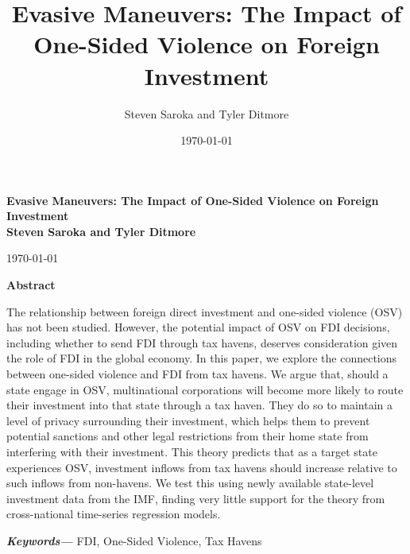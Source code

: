 \documentclass[11pt, titlepage]{article} %
\title{Evasive Maneuvers: The Impact of One-Sided Violence on Foreign Investment}
\author{Steven Saroka and Tyler Ditmore}
\date{\today}
\providecommand{\keywords}[1]
{
  \small	
  \textbf{\textit{Keywords---}} #1
}
\begin{document}
\begin{titlepage}


\thispagestyle{plain}


\singlespacing






\begin{center}
    \huge
    \textbf{Evasive Maneuvers: The Impact of One-Sided Violence on Foreign Investment} \\ 
         
  \vspace{1cm}
    \Large
    \textbf{Steven Saroka and Tyler Ditmore}

          \vspace{0.2cm}
    
    \vspace{0.2cm}
    \today
    
	\normalsize
 
    \vspace{1cm}
    
    \textbf{Abstract}
\end{center}

The relationship between foreign direct investment and one-sided violence (OSV) has not been studied. However, the potential impact of OSV on FDI decisions, including whether to send FDI through tax havens, deserves consideration given the role of FDI in the global economy. In this paper, we explore the connections between one-sided violence and FDI from tax havens. We argue that, should a state engage in OSV, multinational corporations will become more likely to route their investment into that state through a tax haven. They do so to maintain a level of privacy surrounding their investment, which helps them to prevent potential sanctions and other legal restrictions from their home state from interfering with their investment. This theory predicts that as a target state experiences OSV, investment inflows from tax havens should increase relative to such inflows from non-havens. We test this using newly available state-level investment data from the IMF, finding very little support for the theory from cross-national time-series regression models.


\vspace{1cm}

\keywords{FDI, One-Sided Violence, Tax Havens}

\clearpage


\end{titlepage}
\restoregeometry
\doublespacing
\end{document}
